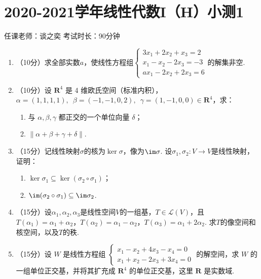 \section{2020-2021学年线性代数I（H）小测1}

\begin{center}
    任课老师：谈之奕\hspace{4em} 考试时长：90分钟
\end{center}

\begin{enumerate}
    \item （10分）求全部实数$a$，使线性方程组$\begin{cases}
        3x_1+2x_2+x_3=2 \\ x_1-x_2-2x_3=-3 \\ ax_1-2x_2+2x_3=6
    \end{cases}$的解集非空.

    \item （10分）设 $\mathbf{R}^4$ 是 4 维欧氏空间（标准内积），$\alpha=(1,1,1,1),\enspace\allowbreak\beta=(-1,-1,0,2),\enspace\allowbreak\gamma=(1,-1,0,0) \in \mathbf{R}^4$，求：
    \begin{enumerate}
        \item 与 $\alpha,\beta,\gamma$ 都正交的一个单位向量 $\delta$；

        \item $\lVert \alpha+\beta+\gamma+\delta \rVert$.
    \end{enumerate}

    \item （15分）记线性映射$\sigma$的核为$\ker\sigma$，像为$\im\sigma$. 设$\sigma_1,\sigma_2\colon V\to V$是线性映射，证明：
    \begin{enumerate}
        \item $\ker\sigma_1\subseteq\ker(\sigma_2\circ\sigma_1)$；

        \item $\im(\sigma_2\circ\sigma_1)\subseteq\im\sigma_2$.
    \end{enumerate}

    \item （15分）设$\alpha_1,\alpha_2,\alpha_3$是线性空间$V$的一组基，$T\in\mathcal{L}(V)$，且$T(\alpha_1)=\alpha_1+\alpha_2$，$T(\alpha_2)=\alpha_1-\alpha_2$，$T(\alpha_3)=\alpha_1+2\alpha_2$. 求$T$的像空间和核空间，以及$T$的秩.

    \item （15分）设 $W$ 是线性方程组 $\begin{cases}
           x_1-x_2+4x_3-x_4=0 \\ x_1+x_2-2x_3+3x_4=0
    \end{cases}$ 的解空间，求 $W$ 的一组单位正交基，并将其扩充成 $\mathbf{R}^4$ 的单位正交基，这里 $\mathbf{R}$ 是实数域.


\end{enumerate}
